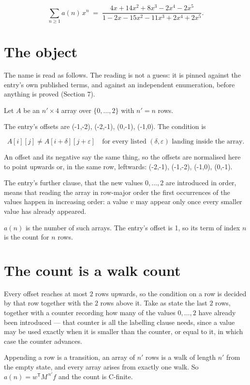\documentclass[11pt]{article}
\theoremstyle{definition}
\begin{document}
\[\sum_{n \ge 1} a(n)\,x^n \;=\; \frac{4x + 14x^{2} + 8x^{3} - 2x^{4} - 2x^{5}}{1 - 2x - 15x^{2} - 11x^{3} + 2x^{4} + 2x^{5}}.\]

\section{The object}

The name is read as follows. The reading is not a guess: it is pinned against the entry's own published terms, and against an independent enumeration, before anything is proved (Section 7).

Let $A$ be an $n' \times 4$ array over $\{0,\dots,2\}$ with $n' = n$ rows.

The entry's offsets are (-1,-2), (-2,-1), (0,-1), (-1,0). The condition is

\[A[i][j] \ne A[i{+}\delta][j{+}\varepsilon]\quad\text{for every listed }(\delta,\varepsilon)\text{ landing inside the array.}\]

An offset and its negative say the same thing, so the offsets are normalised here to point upwards or, in the same row, leftwards: (-2,-1), (-1,-2), (-1,0), (0,-1).

The entry's further clause, that the new values $0,\dots,2$ are introduced in order, means that reading the array in row-major order the first occurrences of the values happen in increasing order: a value $v$ may appear only once every smaller value has already appeared.

$a(n)$ is the number of such arrays. The entry's offset is 1, so its term of index $n$ is the count for $n$ rows.

\section{The count is a walk count}

Every offset reaches at most $2$ rows upwards, so the condition on a row is decided by that row together with the $2$ rows above it. Take as state the last $2$ rows, together with a counter recording how many of the values $0,\dots,2$ have already been introduced --- that counter is all the labelling clause needs, since a value may be used exactly when it is smaller than the counter, or equal to it, in which case the counter advances.

Appending a row is a transition, an array of $n'$ rows is a walk of length $n'$ from the empty state, and every array arises from exactly one walk. So $a(n) = w^{\mathsf T}M^{\,n'}f$ and the count is C-finite.
\end{document}
